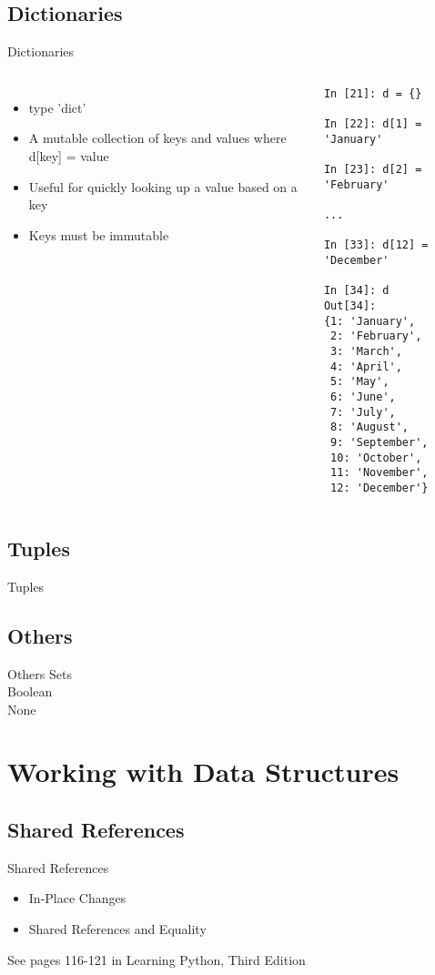 \documentclass{beamer}
\begin{document}
\subsection{Dictionaries}
\begin{frame}[fragile]{Dictionaries}
\begin{columns}[c]
\column{2.5in}
\begin{itemize}
\item{type 'dict'}
\item{A mutable collection of keys and values where d[key] = value}
\item{Useful for quickly looking up a value based on a key}
\item{Keys must be immutable}
\end{itemize}

\column{2.5in}
\tiny
\begin{lstlisting}
In [21]: d = {}

In [22]: d[1] = 'January'

In [23]: d[2] = 'February'

...

In [33]: d[12] = 'December'

In [34]: d
Out[34]:
{1: 'January',
 2: 'February',
 3: 'March',
 4: 'April',
 5: 'May',
 6: 'June',
 7: 'July',
 8: 'August',
 9: 'September',
 10: 'October',
 11: 'November',
 12: 'December'}
\end{lstlisting}
\end{columns}
\end{frame}

\subsection{Tuples}
\begin{frame}[fragile]{Tuples}
\end{frame}

\subsection{Others}
\begin{frame}[fragile]{Others}
Sets\\
Boolean\\
None
\end{frame}

\section{Working with Data Structures}
\subsection{Shared References}
\begin{frame}[fragile]{Shared References}
\begin{itemize}
\item{In-Place Changes}
\item{Shared References and Equality}
\end{itemize}
\tiny{See pages 116-121 in Learning Python, Third Edition}
\end{frame}
\end{document}
